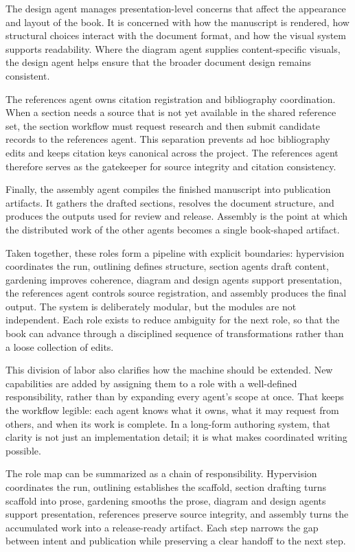 The design agent manages presentation-level concerns that affect the appearance and layout of the book. It is concerned with how the manuscript is rendered, how structural choices interact with the document format, and how the visual system supports readability. Where the diagram agent supplies content-specific visuals, the design agent helps ensure that the broader document design remains consistent.

The references agent owns citation registration and bibliography coordination. When a section needs a source that is not yet available in the shared reference set, the section workflow must request research and then submit candidate records to the references agent. This separation prevents ad hoc bibliography edits and keeps citation keys canonical across the project. The references agent therefore serves as the gatekeeper for source integrity and citation consistency.

Finally, the assembly agent compiles the finished manuscript into publication artifacts. It gathers the drafted sections, resolves the document structure, and produces the outputs used for review and release. Assembly is the point at which the distributed work of the other agents becomes a single book-shaped artifact.

Taken together, these roles form a pipeline with explicit boundaries: hypervision coordinates the run, outlining defines structure, section agents draft content, gardening improves coherence, diagram and design agents support presentation, the references agent controls source registration, and assembly produces the final output. The system is deliberately modular, but the modules are not independent. Each role exists to reduce ambiguity for the next role, so that the book can advance through a disciplined sequence of transformations rather than a loose collection of edits.

This division of labor also clarifies how the machine should be extended. New capabilities are added by assigning them to a role with a well-defined responsibility, rather than by expanding every agent's scope at once. That keeps the workflow legible: each agent knows what it owns, what it may request from others, and when its work is complete. In a long-form authoring system, that clarity is not just an implementation detail; it is what makes coordinated writing possible.

The role map can be summarized as a chain of responsibility. Hypervision coordinates the run, outlining establishes the scaffold, section drafting turns scaffold into prose, gardening smooths the prose, diagram and design agents support presentation, references preserve source integrity, and assembly turns the accumulated work into a release-ready artifact. Each step narrows the gap between intent and publication while preserving a clear handoff to the next step.

